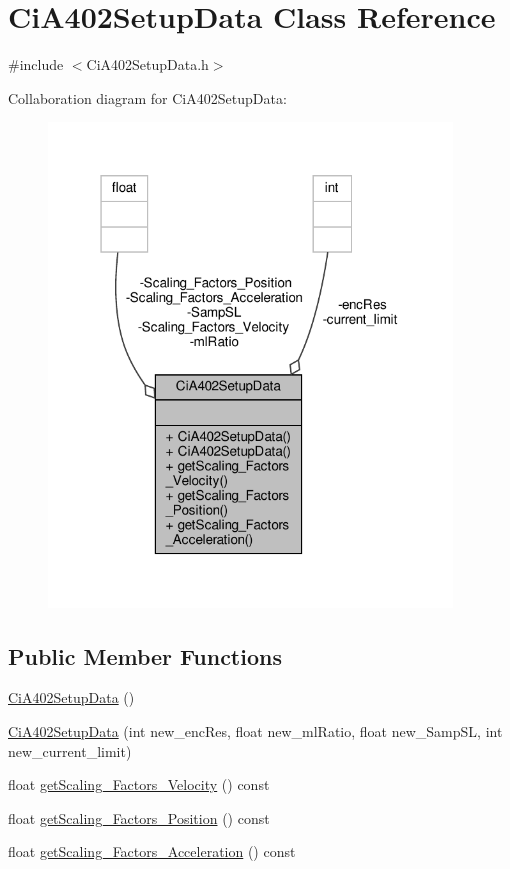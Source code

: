 \hypertarget{classCiA402SetupData}{}\section{Ci\+A402\+Setup\+Data Class Reference}
\label{classCiA402SetupData}


{\ttfamily \#include $<$Ci\+A402\+Setup\+Data.\+h$>$}



Collaboration diagram for Ci\+A402\+Setup\+Data\+:
\nopagebreak
\begin{figure}[H]
\begin{center}
\leavevmode
\includegraphics[width=304pt]{classCiA402SetupData__coll__graph}
\end{center}
\end{figure}
\subsection*{Public Member Functions}
\begin{DoxyCompactItemize}
\item 
\hyperlink{classCiA402SetupData_a75fda7c40eed83f736c227cf681bd0c5}{Ci\+A402\+Setup\+Data} ()
\item 
\hyperlink{classCiA402SetupData_ae7f96988b42fad6572e8227c5a6d1093}{Ci\+A402\+Setup\+Data} (int new\+\_\+enc\+Res, float new\+\_\+ml\+Ratio, float new\+\_\+\+Samp\+SL, int new\+\_\+current\+\_\+limit)
\item 
float \hyperlink{classCiA402SetupData_ac7db2b5ed19f3e2fddfdeee3cf73bbae}{get\+Scaling\+\_\+\+Factors\+\_\+\+Velocity} () const
\item 
float \hyperlink{classCiA402SetupData_aaa5fa09da2e5a3874b19cb1ad7403176}{get\+Scaling\+\_\+\+Factors\+\_\+\+Position} () const
\item 
float \hyperlink{classCiA402SetupData_af2a3390595f6c08c6bf1057d58789a3e}{get\+Scaling\+\_\+\+Factors\+\_\+\+Acceleration} () const
\end{DoxyCompactItemize}
